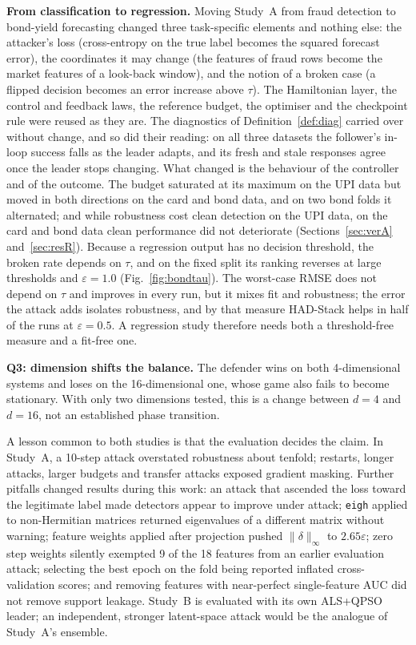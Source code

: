 \documentclass[conference]{IEEEtran}
\begin{document}
\textbf{From classification to regression.} Moving Study~A from fraud detection to bond-yield forecasting changed three task-specific elements and nothing else: the attacker's loss (cross-entropy on the true label becomes the squared forecast error), the coordinates it may change (the features of fraud rows become the market features of a look-back window), and the notion of a broken case (a flipped decision becomes an error increase above $\tau$). The Hamiltonian layer, the control and feedback laws, the reference budget, the optimiser and the checkpoint rule were reused as they are. The diagnostics of Definition~\ref{def:diag} carried over without change, and so did their reading: on all three datasets the follower's in-loop success falls as the leader adapts, and its fresh and stale responses agree once the leader stops changing. What changed is the behaviour of the controller and of the outcome. The budget saturated at its maximum on the UPI data but moved in both directions on the card and bond data, and on two bond folds it alternated; and while robustness cost clean detection on the UPI data, on the card and bond data clean performance did not deteriorate (Sections~\ref{sec:verA} and~\ref{sec:resR}). Because a regression output has no decision threshold, the broken rate depends on $\tau$, and on the fixed split its ranking reverses at large thresholds and $\varepsilon{=}1.0$ (Fig.~\ref{fig:bondtau}). The worst-case RMSE does not depend on $\tau$ and improves in every run, but it mixes fit and robustness; the error the attack adds isolates robustness, and by that measure HAD-Stack helps in half of the runs at $\varepsilon{=}0.5$. A regression study therefore needs both a threshold-free measure and a fit-free one.

\textbf{Q3: dimension shifts the balance.} The defender wins on both 4-dimensional systems and loses on the 16-dimensional one, whose game also fails to become stationary. With only two dimensions tested, this is a change between $d{=}4$ and $d{=}16$, not an established phase transition.

A lesson common to both studies is that the evaluation decides the claim. In Study~A, a 10-step attack overstated robustness about tenfold; restarts, longer attacks, larger budgets and transfer attacks exposed gradient masking. Further pitfalls changed results during this work: an attack that ascended the loss toward the legitimate label made detectors appear to improve under attack; \texttt{eigh} applied to non-Hermitian matrices returned eigenvalues of a different matrix without warning; feature weights applied after projection pushed $\|\delta\|_\infty$ to $2.65\varepsilon$; zero step weights silently exempted 9 of the 18 features from an earlier evaluation attack; selecting the best epoch on the fold being reported inflated cross-validation scores; and removing features with near-perfect single-feature AUC did not remove support leakage. Study~B is evaluated with its own ALS+QPSO leader; an independent, stronger latent-space attack would be the analogue of Study~A's ensemble.
\end{document}
